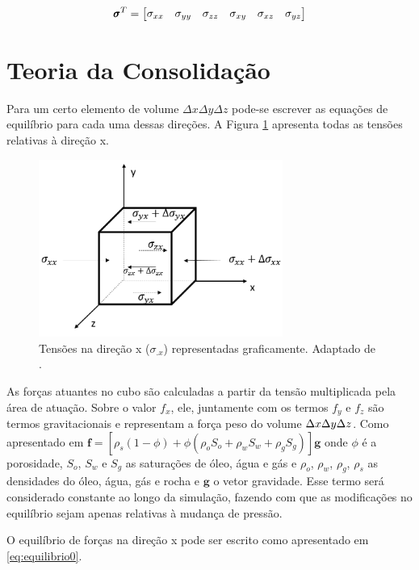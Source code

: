 \begin{equation}
\pmb{\sigma}^T = \begin{bmatrix}
\sigma_{xx} & \sigma_{yy} & \sigma_{zz} & \sigma_{xy} & \sigma_{xz} & \sigma_{yz}
\end{bmatrix}
\label{eq:tensor6}
\end{equation}


\section{Teoria da Consolidação}

Para um certo elemento de volume $\Delta x\Delta y \Delta z$ pode-se escrever as equações de equilíbrio para cada uma dessas direções. A Figura \ref{fig:equilibrio} apresenta todas as tensões relativas à direção x.

\begin{figure}[!htbp]
\centering
\includegraphics[width=8cm]{chap01/figs/equilibrio.png}
\caption{Tensões na direção x ($\sigma_{.x}$) representadas graficamente.  Adaptado de \cite{CompGeomec}.}
\label{fig:equilibrio}
\end{figure}


As forças atuantes no cubo são calculadas a partir da tensão multiplicada pela área de atuação. Sobre o valor $f_x$, ele, juntamente com os termos $f_y$ e $f_z$  são termos gravitacionais e representam a força peso do volume $\Delta x\Delta y\Delta z$. Como apresentado em \citet{xiuligai} $\mathbf{f} = [\rho_s(1-\phi) + \phi(\rho_o S_o + \rho_w S_w + \rho_g S_g )] \mathbf{g}$ onde $\phi$ é a porosidade, $S_o$, $S_w$ e $S_g$ as saturações de óleo, água e gás e $\rho_o$, $\rho_w$, $\rho_g$, $\rho_s$  as densidades do óleo, água, gás e rocha e $\mathbf{g}$ o vetor gravidade. Esse termo será considerado constante ao longo da simulação, fazendo com que as modificações no equilíbrio sejam apenas relativas à mudança de pressão. 

O equilíbrio de forças na direção x pode ser escrito como apresentado em \eqref{eq:equilibrio0}. 


